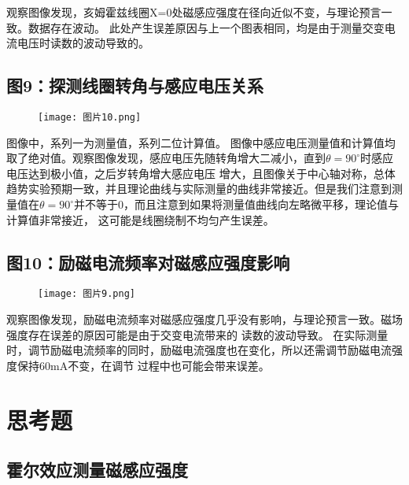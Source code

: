 \documentclass[12pt,a4paper]{article}
\newcommand*{\song}{\CJKfamily{zhsong}}
\newcommand{\sectionfont}{\song\textbf}
\begin{document}
    观察图像发现，亥姆霍兹线圈X=0处磁感应强度在径向近似不变，与理论预言一致。数据存在波动。
    此处产生误差原因与上一个图表相同，均是由于测量交变电流电压时读数的波动导致的。

    \subsection{图9：探测线圈转角与感应电压关系}
    \begin{figure}[H]
        \centering
        \texttt{[image: 图片10.png]}
    \end{figure}
    图像中，系列一为测量值，系列二位计算值。
    图像中感应电压测量值和计算值均取了绝对值。观察图像发现，感应电压先随转角增大二减小，直到$\theta=90^{\circ}$时感应电压达到极小值，之后岁转角增大感应电压
    增大，且图像关于中心轴对称，总体趋势实验预期一致，并且理论曲线与实际测量的曲线非常接近。但是我们注意到测量值在$\theta=90^{\circ}$并不等于0，而且注意到如果将测量值曲线向左略微平移，理论值与计算值非常接近，
    这可能是线圈绕制不均匀产生误差。


    \subsection{图10：励磁电流频率对磁感应强度影响}
    \begin{figure}[H]
        \centering
        \texttt{[image: 图片9.png]}
    \end{figure}

    观察图像发现，励磁电流频率对磁感应强度几乎没有影响，与理论预言一致。磁场强度存在误差的原因可能是由于交变电流带来的
    读数的波动导致。
    在实际测量时，调节励磁电流频率的同时，励磁电流强度也在变化，所以还需调节励磁电流强度保持60mA不变，在调节
    过程中也可能会带来误差。

\section{\sectionfont 思考题}
    \subsection{霍尔效应测量磁感应强度}
\end{document}

